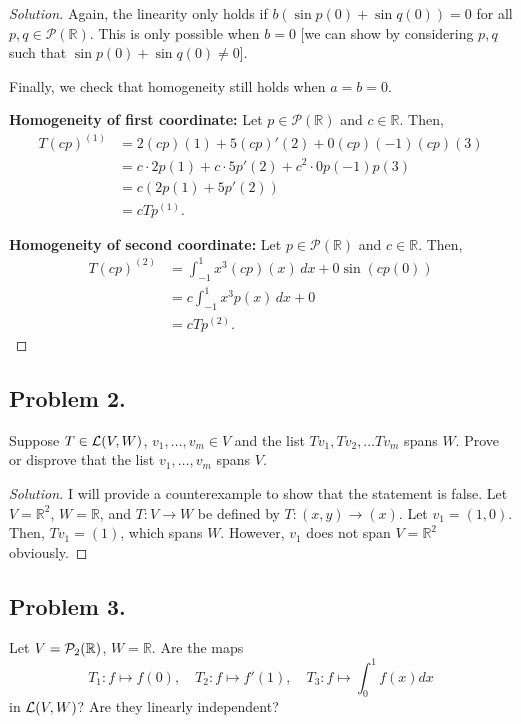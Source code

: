 \documentclass{article}
\begin{document}
\begin{proof}[Solution]
    Again, the linearity only holds if $b(\sin p(0) + \sin q(0)) = 0$ for all 
    $p, q \in \mathcal{P}(\mathbb{R})$. This is only possible when $b = 0$ [we can show by 
    considering $p,q$ such that $\sin p(0) + \sin q(0)\neq 0$].

    Finally, we check that homogeneity still holds when $a = b = 0$.

    \textbf{Homogeneity of first coordinate:} Let $p \in \mathcal{P}(\mathbb{R})$ and 
    $c \in \mathbb{R}$. Then,
    \begin{align*}
        T(cp)^{(1)} & = 2(cp)(1) + 5(cp)'(2) + 0(cp)(-1)(cp)(3) \\
        & = c\cdot2p(1) + c\cdot5p'(2) + c^2\cdot0p(-1)p(3) \\
        & = c\left(2p(1) + 5p'(2)\right) \\
        & = cTp^{(1)}.
    \end{align*}

    \textbf{Homogeneity of second coordinate:} Let $p \in \mathcal{P}(\mathbb{R})$ and
    $c \in \mathbb{R}$. Then,
    \begin{align*}
        T(cp)^{(2)} & = \int_{-1}^1 x^3 (cp)(x) \, dx + 0 \sin (cp(0)) \\
        & = c\int_{-1}^1 x^3 p(x) \, dx + 0 \\
        & = cTp^{(2)}.
    \end{align*}
\end{proof}

\newpage
\subsection*{Problem 2.}
Suppose $T \in {\cal L} (V,W)$, $v_1, \ldots, v_m \in V$ and the list
$Tv_1, Tv_2, \ldots Tv_m$ spans $W$. Prove or disprove that the list $v_1, \ldots, v_m$ spans $V$. 

\begin{proof}[Solution]
    I will provide a counterexample to show that the statement is false. Let $V = \mathbb{R}^2$,
    $W = \mathbb{R}$, and $T: V \to W$ be defined by $T: (x, y) \rightarrow (x)$. Let $v_1 = (1, 0)$. 
    Then, $Tv_1 = (1)$, which spans $W$. However, $v_1$ does not span $V=\mathbb{R}^2$ obviously.
\end{proof}

\newpage
\subsection*{Problem 3.}
Let $V={\cal P}_2(\mathbb{R})$, $W=\mathbb{R}$. Are the maps $$T_1: f\mapsto f(0), \quad T_2: f\mapsto f'(1), 
\quad T_3 : f\mapsto \int_{0}^1 f(x) dx$$ in ${\cal L}(V,W)$? Are they linearly independent?
\end{document}
